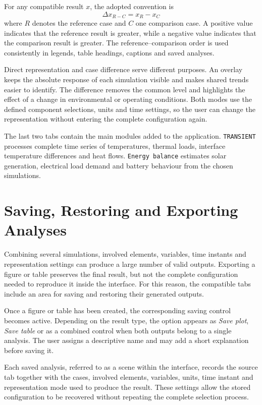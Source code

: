 For any compatible result \(x\), the adopted convention is
\begin{equation}
    \Delta x_{R-C}
    =
    x_R-x_C
    \label{eq:case_difference_ch6}
\end{equation}
where \(R\) denotes the reference case and \(C\) one comparison case. A
positive value indicates that the reference result is greater, while a
negative value indicates that the comparison result is greater. The
reference--comparison order is used consistently in legends, table headings,
captions and saved analyses.

Direct representation and case difference serve different purposes. An
overlay keeps the absolute response of each simulation visible and makes shared
trends easier to identify. The difference removes the common level and
highlights the effect of a change in environmental or operating conditions.
Both modes use the defined component selections, units and time settings, so
the user can change the representation without entering the complete
configuration again.

The last two tabs contain the main modules added to the application.
\texttt{TRANSIENT} processes complete time series of temperatures, thermal
loads, interface temperature differences and heat flows. \texttt{Energy
balance} estimates solar generation, electrical load demand and battery
behaviour from the chosen simulations.

\section{Saving, Restoring and Exporting Analyses}
\label{sec:analysis_saving_export}

Combining several simulations, involved elements, variables, time instants and
representation settings can produce a large number of valid outputs. Exporting
a figure or table preserves the final result, but not the complete
configuration needed to reproduce it inside the interface. For this reason,
the compatible tabs include an area for saving and restoring their generated
outputs.

Once a figure or table has been created, the corresponding saving control
becomes active. Depending on the result type, the option appears as
\emph{Save plot}, \emph{Save table} or as a combined control when both outputs
belong to a single analysis. The user assigns a descriptive name and may add a
short explanation before saving it.

Each saved analysis, referred to as a scene within the interface, records the
source tab together with the cases, involved elements, variables, units, time
instant and representation mode used to produce the result. These settings
allow the stored configuration to be recovered without repeating the complete
selection process.

